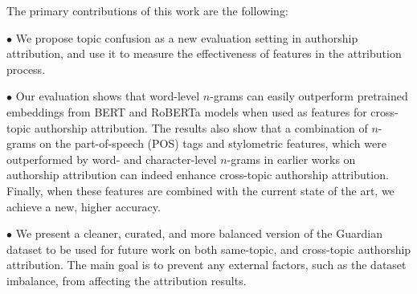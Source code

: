 \documentclass[11pt]{article}
\begin{document}
The primary contributions of this work are the following: 

\noindent$\bullet$ We propose topic confusion as a new evaluation setting in authorship attribution, and use it to measure the effectiveness of features in the attribution process.

\noindent$\bullet$ Our evaluation shows that word-level $n$-grams can easily outperform pretrained embeddings from BERT and RoBERTa models when used as features for cross-topic authorship attribution. The results also show that a combination of $n$-grams on the part-of-speech (POS) tags and stylometric features, which were outperformed by word- and character-level $n$-grams in earlier works on authorship attribution can indeed enhance cross-topic authorship attribution. Finally, when these features are combined with the current state of the art, we achieve a new, higher accuracy.

\noindent$\bullet$ We present a cleaner, curated, and more balanced version of the Guardian dataset to be used for future work on both same-topic, and cross-topic authorship attribution. The main goal is to prevent any external factors, such as the dataset imbalance, from affecting the attribution results.
\end{document}
